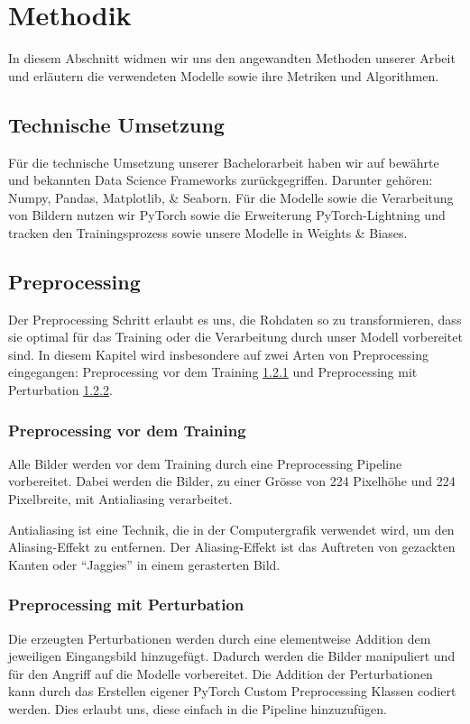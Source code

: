 \section{Methodik} 

In diesem Abschnitt widmen wir uns den angewandten Methoden unserer Arbeit und erläutern die verwendeten Modelle sowie ihre Metriken und Algorithmen.

\subsection{Technische Umsetzung}

Für die technische Umsetzung unserer Bachelorarbeit haben wir auf bewährte und bekannten Data Science Frameworks zurückgegriffen. Darunter gehören: Numpy, Pandas, Matplotlib, \& Seaborn. Für die Modelle sowie die Verarbeitung von Bildern nutzen wir PyTorch sowie die Erweiterung PyTorch-Lightning und tracken den Trainingsprozess sowie unsere Modelle in Weights \& Biases.

\subsection{Preprocessing}  \label{chap:preprocessing}

Der Preprocessing Schritt erlaubt es uns, die Rohdaten so zu transformieren, dass sie optimal für das Training oder die Verarbeitung durch unser Modell vorbereitet sind. In diesem Kapitel wird insbesondere auf zwei Arten von Preprocessing eingegangen: Preprocessing vor dem Training \ref{chap:Preprocessing vor dem Training} und Preprocessing mit Perturbation \ref{chap:Preprocessing mit Perturbation}.

\subsubsection{Preprocessing vor dem Training} \label{chap:Preprocessing vor dem Training}

Alle Bilder werden vor dem Training durch eine Preprocessing Pipeline vorbereitet. Dabei werden die Bilder, zu einer Grösse von 224 Pixelhöhe und 224 Pixelbreite, mit Antialiasing verarbeitet. 

Antialiasing ist eine Technik, die in der Computergrafik verwendet wird, um den Aliasing-Effekt zu entfernen. Der Aliasing-Effekt ist das Auftreten von gezackten Kanten oder "`Jaggies"' in einem gerasterten Bild.

\subsubsection{Preprocessing mit Perturbation} \label{chap:Preprocessing mit Perturbation}

Die erzeugten Perturbationen werden durch eine elementweise Addition dem jeweiligen Eingangsbild hinzugefügt. Dadurch werden die Bilder manipuliert und für den Angriff auf die Modelle vorbereitet. Die Addition der Perturbationen kann durch das Erstellen eigener PyTorch Custom Preprocessing Klassen codiert werden. Dies erlaubt uns, diese einfach in die Pipeline hinzuzufügen. 



